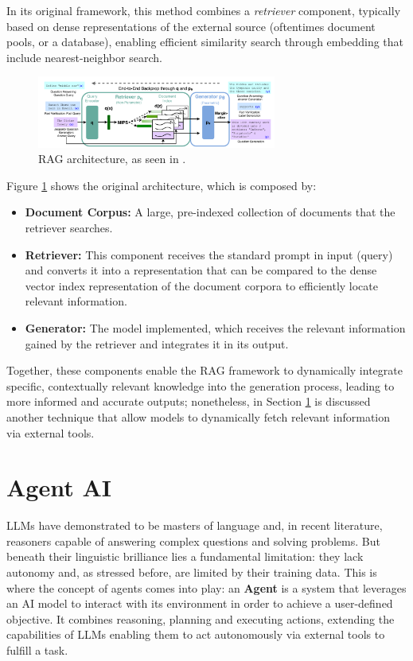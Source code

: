 In its original framework, this method combines a \textit{retriever} component, typically based on dense representations of the external source (oftentimes document pools, or a database), enabling efficient similarity search through embedding that include nearest-neighbor search.

\begin{figure}[h]
    \centering
    \includegraphics[width=0.7\textwidth]{images/rag-components.png}
    \caption{RAG architecture, as seen in \cite{lewis2020retrieval}.}
    \label{fig:rag}
\end{figure}

Figure \ref{fig:rag} shows the original architecture, which is composed by:

\begin{itemize}
    \item \textbf{Document Corpus:} A large, pre-indexed collection of documents that the retriever searches.
    \item \textbf{Retriever:} This component receives the standard prompt in input (query) and converts it into a representation that can be compared to the dense vector index representation of the document corpora to efficiently locate relevant information.
    \item \textbf{Generator:} The model implemented, which receives the relevant information gained by the retriever and integrates it in its output.
\end{itemize}

Together, these components enable the RAG framework to dynamically integrate specific, contextually relevant knowledge into the generation process, leading to more informed and accurate outputs; nonetheless, in Section \ref{sec:agent-ai} is discussed another technique that allow models to dynamically fetch relevant information via external tools.




\section{Agent AI}
\label{sec:agent-ai}

LLMs have demonstrated to be masters of language and, in recent literature, reasoners capable of answering complex questions and solving problems. But beneath their linguistic brilliance lies a fundamental limitation: they lack autonomy and, as stressed before, are limited by their training data. This is where the concept of agents comes into play: an \textbf{Agent} is a system that leverages an AI model to interact with its environment in order to achieve a user-defined objective. It combines reasoning, planning and executing actions, extending the capabilities of LLMs enabling them to act autonomously via external tools to fulfill a task.

